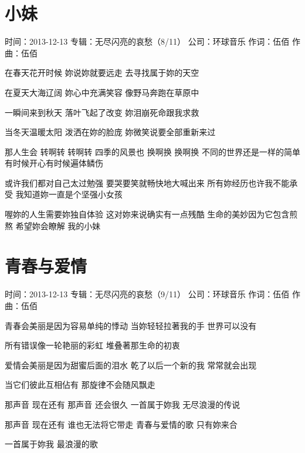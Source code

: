 \documentclass[UTF8,a4paper,oneside,twocolumn,12pt]{ctexbook}
\newcommand{\infopair}[2]{\textbullet #1：#2}
\newcommand{\zc}[1][伍佰]{\infopair{作词}{#1}}
\newcommand{\zq}[1][伍佰]{\infopair{作曲}{#1}}
\newcommand{\zj}[1]{\infopair{专辑}{#1}}
\newcommand{\sj}[1]{\infopair{时间}{#1}}
\newcommand{\gs}[1]{\infopair{公司}{#1}}
\newenvironment{info}{\begin{flushleft}\kaishu
	}
	{\end{flushleft}\normalsize\yahei\par}
\newenvironment{lyric}{
	}
{}
\begin{document}
\section{小妹}
\begin{info}
	\sj{2013-12-13}
	\zj{无尽闪亮的哀愁（8/11）}
	\gs{环球音乐}
	\zc
	\zq
\end{info}
\begin{lyric}
	在春天花开时候
	妳说妳就要远走
	去寻找属于妳的天空

	在夏天大海辽阔
	妳心中充满笑容
	像野马奔跑在草原中

	一瞬间来到秋天
	落叶飞起了改变
	妳泪崩死命跟我求救

	当冬天温暖太阳
	泼洒在妳的脸庞
	妳微笑说要全部重新来过

	那人生会 转啊转 转啊转
	四季的风景也 换啊换 换啊换
	不同的世界还是一样的简单
	有时候开心有时候遍体鳞伤

	或许我们都对自己太过勉强
	要哭要笑就畅快地大喊出来
	所有妳经历也许我不能承受
	我知道妳一直是个坚强小女孩

	喔妳的人生需要妳独自体验
	这对妳来说确实有一点残酷
	生命的美妙因为它包含煎熬
	希望妳会瞭解 我的小妹
\end{lyric}

\section{青春与爱情}
\begin{info}
	\sj{2013-12-13}
	\zj{无尽闪亮的哀愁（9/11）}
	\gs{环球音乐}
	\zc
	\zq
\end{info}
\begin{lyric}
	青春会美丽是因为容易单纯的悸动
	当妳轻轻拉著我的手  世界可以没有

	所有错误像一轮艳丽的彩虹
	堆叠著那生命的初衷

	爱情会美丽是因为甜蜜后面的泪水
	乾了以后一个新的我  常常就会出现

	当它们彼此互相佔有
	那旋律不会随风飘走

	那声音  现在还有  那声音  还会很久
	一首属于妳我  无尽浪漫的传说

	那声音  现在还有  谁也无法将它带走
	青春与爱情的歌  只有妳来合

	一首属于妳我  最浪漫的歌
\end{lyric}
\end{document}
